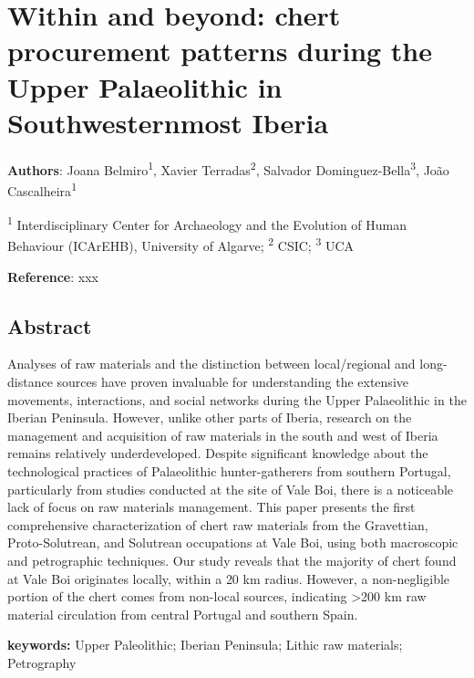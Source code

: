 \documentclass[
  a4paper,
  DIV=11,
  numbers=noendperiod]{scrreprt}
\begin{document}

\chapter{Within and beyond: chert procurement patterns during the Upper
Palaeolithic in Southwesternmost
Iberia}\label{within-and-beyond-chert-procurement-patterns-during-the-upper-palaeolithic-in-southwesternmost-iberia}

\textbf{Authors}: Joana Belmiro\textsuperscript{1}, Xavier
Terradas\textsuperscript{2}, Salvador
Dominguez-Bella\textsuperscript{3}, João Cascalheira\textsuperscript{1}

\textsuperscript{1} Interdisciplinary Center for Archaeology and the
Evolution of Human Behaviour (ICArEHB), University of Algarve;
\textsuperscript{2} CSIC; \textsuperscript{3} UCA

\textbf{Reference}: xxx

\section*{Abstract}\label{abstract-2}


Analyses of raw materials and the distinction between local/regional and
long-distance sources have proven invaluable for understanding the
extensive movements, interactions, and social networks during the Upper
Palaeolithic in the Iberian Peninsula. However, unlike other parts of
Iberia, research on the management and acquisition of raw materials in
the south and west of Iberia remains relatively underdeveloped. Despite
significant knowledge about the technological practices of Palaeolithic
hunter-gatherers from southern Portugal, particularly from studies
conducted at the site of Vale Boi, there is a noticeable lack of focus
on raw materials management. This paper presents the first comprehensive
characterization of chert raw materials from the Gravettian,
Proto-Solutrean, and Solutrean occupations at Vale Boi, using both
macroscopic and petrographic techniques. Our study reveals that the
majority of chert found at Vale Boi originates locally, within a 20 km
radius. However, a non-negligible portion of the chert comes from
non-local sources, indicating \textgreater200 km raw material
circulation from central Portugal and southern Spain.

\textbf{keywords:} Upper Paleolithic; Iberian Peninsula; Lithic raw
materials; Petrography
\end{document}
